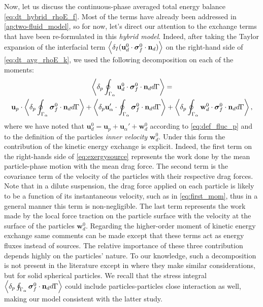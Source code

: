 Now, let us discuss the continuous-phase averaged total energy balance \eqref{eq:dt_hybrid_rhoE_f}. 
Most of the terms have already been addressed in \ref{ap:two-fluid_model}, so for now, let's direct our attention to the exchange terms that have been re-formulated in this \textit{hybrid model}. 
Indeed, after taking the Taylor expansion of the interfacial term $\left<\delta_I (\textbf{u}^0_d \cdot \bm{\sigma}_f^0 \cdot \textbf{n}_d)\right>$ on the right-hand side of \ref{eq:dt_avg_rhoE_k}, we used the following decomposition on each of the moments:
\begin{multline}
    \label{eq:exergysource}
    \pavg{ \intS{\textbf{u}^0_d \cdot \bm{\sigma}_f^0 \cdot \textbf{n}_d}}
    = \\
    \textbf{u}_p \cdot \pSavg{{\bm{\sigma}_f^0 \cdot \textbf{n}_d}}
    + \pavg{ \textbf{u}_\alpha' \cdot \intS{  \bm{\sigma}_f^0 \cdot \textbf{n}_d}}
    + \pavg{ \intS{\textbf{w}_d^0 \cdot \bm{\sigma}_f^0 \cdot \textbf{n}_d}},
\end{multline}
where we have noted that $\textbf{u}_d^0 = \textbf{u}_p + \textbf{u}_\alpha' +\textbf{w}_d^0$ according to \ref{eq:def_fluc_p} and to the definition of the particles \textit{inner velocity} $\textbf{w}_d^0$. 
Under this form the contribution of the kinetic energy exchange is explicit. 
Indeed, the first term on the right-hands side of \ref{eq:exergysource} represents the work done by the mean particle-phase motion with the mean drag force.
The second term is the covariance term of the velocity of the particles with their respective drag forces.
Note that in a dilute suspension, the drag force applied on each particle is likely to be a function of its instantaneous velocity, such as in \ref{eq:first_mom}, thus in a general manner this term is non-negligible. 
The last term represents the work made by the local force traction on the particle surface with the velocity at the surface of the particles $\textbf{w}_d^0$.
Regarding the higher-order moment of kinetic energy exchange same comments can be made except that these terms act as energy fluxes instead of sources. 
The relative importance of these three contribution depends highly on the particles' nature. 
To our knowledge, such a decomposition is not present in the literature except in \citep[Chapter 2]{scorsim2021particle} where they make similar considerations, but for solid spherical particles.
We recall that the stress integral $\left<\delta_p \oint_{\Gamma_{\alpha}} \bm{\sigma}_f^0 \cdot \textbf{n}_d d\Gamma\right>$ could include particles-particles close interaction as well, making our model consistent with the latter study.


